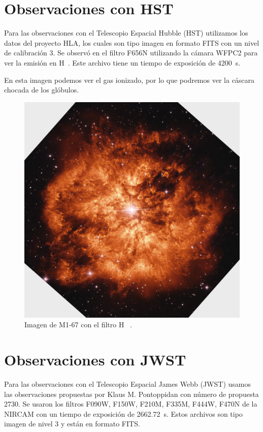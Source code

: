 \documentclass{book}
\begin{document}
\section{Observaciones con HST}

Para las observaciones con el Telescopio Espacial Hubble (HST) utilizamos los datos del proyecto HLA, los cuales son tipo imagen en formato FITS con un nivel de calibración 3.  Se observó en el filtro F656N utilizando la cámara WFPC2 para ver la emisión en \unit{H\alpha}. Este archivo tiene un tiempo de exposición de \SI{4200}{s}.  

En esta imagen podemos ver el gas ionizado, por lo que podremos ver la cáscara chocada de los glóbulos.

\begin{figure}[htb]
    \centering
    \includegraphics[width=\textwidth]{m1-67-comp-full-hst.jpg}
    \caption{Imagen de M1-67 con el filtro \unit{H\alpha} .}
    \label{fig:M1-67HST}
\end{figure}

\section{Observaciones con JWST}

Para las observaciones con el Telescopio Espacial James Webb (JWST) usamos las observaciones propuestas por Klaus M. Pontoppidan con número de propuesta 2730. Se usaron los filtros F090W, F150W, F210M, F335M, F444W, F470N de la NIRCAM con un tiempo de exposición de \SI{2662.72}{s}. Estos archivos son tipo imagen de nivel 3 y están en formato FITS.
\end{document}
